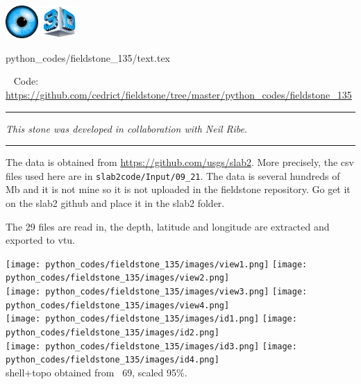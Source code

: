 \includegraphics[height=1.25cm]{images/pictograms/visualisation}
\includegraphics[height=1.25cm]{images/pictograms/3d}

\begin{flushright} {\tiny {\color{gray} python\_codes/fieldstone\_135/text.tex}} \end{flushright}

%

\begin{center}
\inpython ~
Code: \url{https://github.com/cedrict/fieldstone/tree/master/python_codes/fieldstone_135}
\end{center}

\par\noindent\rule{\textwidth}{0.4pt}

{\sl This stone was developed in collaboration with Neil Ribe}. 

\par\noindent\rule{\textwidth}{0.4pt}

The data is obtained from \url{https://github.com/usgs/slab2}. More precisely,
the csv files used here are in {\tt slab2code/Input/09\_21}. The data is several hundreds of Mb
and it is not mine so it is not uploaded in the fieldstone repository. Go get 
it on the slab2 github and place it in the slab2 folder.

The 29 files are read in, the depth, latitude and longitude are extracted and exported
to vtu. 

\begin{center}
\texttt{[image: python\_codes/fieldstone\_135/images/view1.png]}
\texttt{[image: python\_codes/fieldstone\_135/images/view2.png]}\\
\texttt{[image: python\_codes/fieldstone\_135/images/view3.png]}
\texttt{[image: python\_codes/fieldstone\_135/images/view4.png]}\\
\texttt{[image: python\_codes/fieldstone\_135/images/id1.png]}
\texttt{[image: python\_codes/fieldstone\_135/images/id2.png]}\\
\texttt{[image: python\_codes/fieldstone\_135/images/id3.png]}
\texttt{[image: python\_codes/fieldstone\_135/images/id4.png]}\\
{\captionfont shell+topo obtained from \stone~69, scaled 95\%.}
\end{center}
